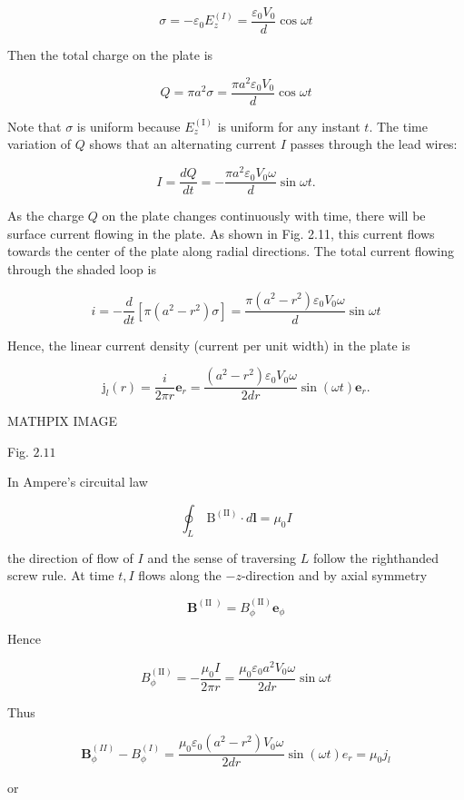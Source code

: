 \documentclass[10pt]{article}
\begin{document}
$$
\sigma=-\varepsilon_{0} E_{z}^{(I)}=\frac{\varepsilon_{0} V_{0}}{d} \cos \omega t
$$

Then the total charge on the plate is

$$
Q=\pi a^{2} \sigma=\frac{\pi a^{2} \varepsilon_{0} V_{0}}{d} \cos \omega t
$$

Note that $\sigma$ is uniform because $E_{z}^{(\mathrm{I})}$ is uniform for any instant $t$. The time variation of $Q$ shows that an alternating current $I$ passes through the lead wires:

$$
I=\frac{d Q}{d t}=-\frac{\pi a^{2} \varepsilon_{0} V_{0} \omega}{d} \sin \omega t .
$$

As the charge $Q$ on the plate changes continuously with time, there will be surface current flowing in the plate. As shown in Fig. 2.11, this current flows towards the center of the plate along radial directions. The total current flowing through the shaded loop is

$$
i=-\frac{d}{d t}\left[\pi\left(a^{2}-r^{2}\right) \sigma\right]=\frac{\pi\left(a^{2}-r^{2}\right) \varepsilon_{0} V_{0} \omega}{d} \sin \omega t
$$

Hence, the linear current density (current per unit width) in the plate is

$$
\mathrm{j}_{l}(r)=\frac{i}{2 \pi r} \mathbf{e}_{r}=\frac{\left(a^{2}-r^{2}\right) \varepsilon_{0} V_{0} \omega}{2 d r} \sin (\omega t) \mathbf{e}_{r} .
$$

MATHPIX IMAGE

Fig. $2.11$ 

 In Ampere's circuital law

$$
\oint_{L} \mathrm{~B}^{(\mathrm{II})} \cdot d \mathbf{l}=\mu_{0} I
$$

the direction of flow of $I$ and the sense of traversing $L$ follow the righthanded screw rule. At time $t, I$ flows along the $-z$-direction and by axial symmetry

$$
\mathbf{B}^{(\text {II })}=B_{\phi}^{(\mathrm{II})} \mathbf{e}_{\phi}
$$

Hence

$$
B_{\phi}^{(\mathrm{II})}=-\frac{\mu_{0} I}{2 \pi r}=\frac{\mu_{0} \varepsilon_{0} a^{2} V_{0} \omega}{2 d r} \sin \omega t
$$

Thus

$$
\mathbf{B}_{\phi}^{(I I)}-B_{\phi}^{(I)}=\frac{\mu_{0} \varepsilon_{0}\left(a^{2}-r^{2}\right) V_{0} \omega}{2 d r} \sin (\omega t) e_{r}=\mu_{0} j_{l}
$$

or
\end{document}
